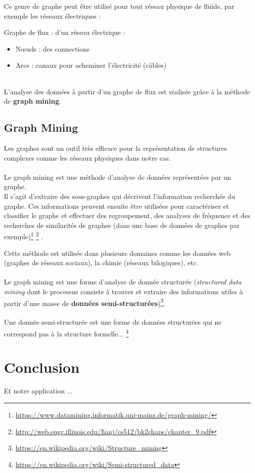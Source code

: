 	\begin{frame}
		Ce genre de graphe peut être utilisé pour tout réseau physique de fluide, par exemple les réseaux électriques :
		\pause
		\begin{exampleblock}{Graphe de flux : d'un réseau électrique :}
		\begin{itemize}
		\item Nœuds : des connections
		\item Arcs : canaux pour acheminer l'électricité (câbles)
		\end{itemize}
		\end{exampleblock}
		~\\
		\pause
		L'analyse des données à partir d'un graphe de flux est réalisée grâce à la méthode de \textbf{graph mining}.
	\end{frame}	
	
	\subsection{Graph Mining}
	\begin{frame}
		Les graphes sont un outil très efficace pour la représentation de structures complexes comme les réseaux physiques dans notre cas.\\~\\
		\pause
		Le graph mining est une méthode d'analyse de données représentées par un graphe.\\ 
		\pause
		Il s'agit d'extraire des sous-graphes qui décrivent l'information recherchée du graphe. Ces informations peuvent ensuite être utilisées pour caractériser et classifier le graphe et effectuer des regroupement, des analyses de fréquence et des recherches de similarités de graphes (dans une base de données de graphes par exemple)\footnote{\href{https://www.datamining.informatik.uni-mainz.de/graph-mining/}{https://www.datamining.informatik.uni-mainz.de/graph-mining/}}
		\footnote{\href{http://web.engr.illinois.edu/\~hanj/cs512/bk2chaps/chapter\_9.pdf}{http://web.engr.illinois.edu/\~hanj/cs512/bk2chaps/chapter\_9.pdf}}
		.
	\end{frame}
	\begin{frame}
		Cette méthode est utilisée dans plusieurs domaines comme les données web (graphes de réseaux sociaux), la chimie (réseaux bilogiques), etc.
		\\~\\
		\pause
		Le graph mining est une forme d'analyse de donnée structurée (\textit{structured data mining} dont le processus consiste à trouver et extraire des informations utiles à partir d'une masse de \textbf{données semi-structurées})\footnote{\href{https://en.wikipedia.org/wiki/Structure\_mining}{https://en.wikipedia.org/wiki/Structure\_mining}}.\\~\\
		\pause
		Une donnée semi-structurée est une forme de données structurées qui ne correspond pas à la structure formelle... \footnote{\href{https://en.wikipedia.org/wiki/Semi-structured\_data}{https://en.wikipedia.org/wiki/Semi-structured\_data}}
	\end{frame}
	
	\section{Conclusion}
	\begin{frame}
		Et notre application ...
	\end{frame}


